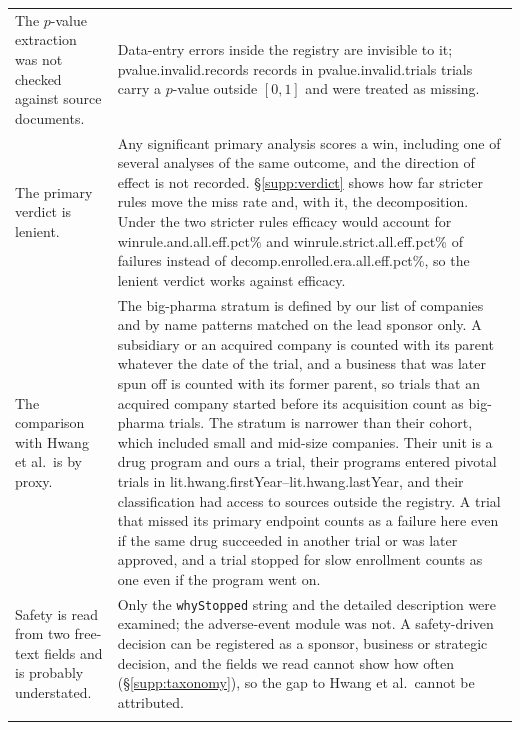 \documentclass[11pt]{article}
\newcommand{\code}[1]{\texttt{\small #1}}
\begin{document}
\begin{longtable}{>{\raggedright\arraybackslash}p{}>{\raggedright\arraybackslash}p{}}
\addlinespace
The $p$-value extraction was not checked against source documents. & Data-entry errors inside the registry are invisible to it; \num{pvalue.invalid.records} records in \num{pvalue.invalid.trials} trials carry a $p$-value outside $[0, 1]$ and were treated as missing. \\
\addlinespace
The primary verdict is lenient. & Any significant primary analysis scores a win, including one of several analyses of the same outcome, and the direction of effect is not recorded. \S\ref{supp:verdict} shows how far stricter rules move the miss rate and, with it, the decomposition. Under the two stricter rules efficacy would account for \num{winrule.and.all.eff.pct}\% and \num{winrule.strict.all.eff.pct}\% of failures instead of \num{decomp.enrolled.era.all.eff.pct}\%, so the lenient verdict works against efficacy. \\
\addlinespace
The comparison with Hwang et al.\ is by proxy. & The big-pharma stratum is defined by our list of companies and by name patterns matched on the lead sponsor only. A subsidiary or an acquired company is counted with its parent whatever the date of the trial, and a business that was later spun off is counted with its former parent, so trials that an acquired company started before its acquisition count as big-pharma trials. The stratum is narrower than their cohort, which included small and mid-size companies. Their unit is a drug program and ours a trial, their programs entered pivotal trials in \num{lit.hwang.firstYear}--\num{lit.hwang.lastYear}, and their classification had access to sources outside the registry. A trial that missed its primary endpoint counts as a failure here even if the same drug succeeded in another trial or was later approved, and a trial stopped for slow enrollment counts as one even if the program went on. \\
\addlinespace
Safety is read from two free-text fields and is probably understated. & Only the \code{whyStopped} string and the detailed description were examined; the adverse-event module was not. A safety-driven decision can be registered as a sponsor, business or strategic decision, and the fields we read cannot show how often (\S\ref{supp:taxonomy}), so the gap to Hwang et al.\ cannot be attributed. \\
\addlinespace

\end{longtable}
\end{document}
